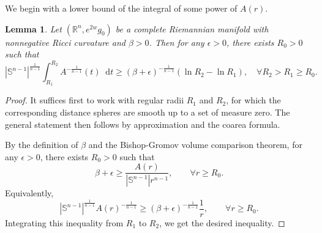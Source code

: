 \documentclass[12pt]{amsart}
\theoremstyle{plain}
\newtheorem{lemma}[theorem]{Lemma}
\theoremstyle{definition}
\theoremstyle{remark}     %
\numberwithin{equation}{section}
\newcommand{\dd}{\mathop{}\!\mathrm{d}}%
\begin{document}
We begin with a lower bound of the integral of some power of $A(r)$.
\begin{lemma}\label{lemma. lower bound of integral of A(r)}
    Let $(\mathbb{R}^n,e^{2w}g_0)$ be a complete Riemannian manifold with nonnegative Ricci curvature and $\beta>0$. Then for any $\epsilon>0$, there exists $R_0>0$ such that
    \[
        |\mathbb{S}^{n-1}|^{\frac{1}{n-1}} 
        \int_{R_1}^{R_2} A^{-\frac{1}{n-1}}(t)\dd t
        \geq (\beta+\epsilon)^{-\frac{1}{n-1}}
        (\ln R_2-\ln R_1),\quad \forall R_2>R_1\geq R_0.
    \]
\end{lemma}
\begin{proof}

It suffices first to work with regular radii $R_1$ and $R_2$,
for which the corresponding distance spheres are smooth up to a
set of measure zero. The general statement then follows by
approximation and the coarea formula.

    By the definition of $\beta$ and the Bishop-Gromov volume comparison theorem, for any $\epsilon>0$, there exists $R_0>0$ such that
    \[
        \beta+\epsilon\geq \frac{A(r)}{|\mathbb{S}^{n-1}|r^{n-1}},\qquad \forall r\geq R_0.
    \]
    Equivalently,
    \[
        |\mathbb{S}^{n-1}|^{\frac{1}{n-1}} 
        A(r)^{-\frac{1}{n-1}}
        \geq (\beta+\epsilon)^{-\frac{1}{n-1}}\frac{1}{r},\qquad \forall r\geq R_0.
    \]
    Integrating this inequality from $R_1$ to $R_2$, we get the desired inequality.
    \end{proof}
    
\end{document}
